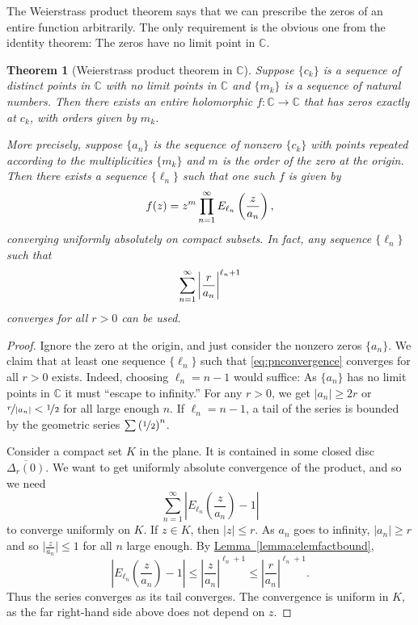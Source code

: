 \documentclass[12pt,openany]{book}
\newcommand{\avoidbreak}{\postdisplaypenalty=100}
\newcommand{\sabs}[1]{\lvert {#1} \rvert}
\newcommand{\babs}[1]{\bigl\lvert {#1} \bigr\rvert}
\newcommand{\abs}[1]{\left\lvert {#1} \right\rvert}
\newcommand{\C}{{\mathbb{C}}}
\newcommand{\myquote}[1]{``#1''}
\theoremstyle{plain}
\newtheorem{thm}{Theorem}[section]
\theoremstyle{remark}
\theoremstyle{definition}
\theoremstyle{exercise}
\theoremstyle{example}
\newcommand{\lemmaref}[1]{\hyperref[#1]{Lemma~\ref*{#1}}}
\begin{document}
The Weierstrass product theorem says that
we can prescribe the zeros of an entire function arbitrarily.
The only requirement is the obvious one from the identity theorem:
The zeros have no limit point in $\C$.

\begin{thm}[Weierstrass product theorem in $\C$]
\index{Weierstrass product theorem in $\C$}
Suppose $\{ c_k \}$ is a sequence of distinct points in $\C$
with no limit points in $\C$ and $\{ m_k \}$ is a sequence of
natural numbers.
Then there exists an entire holomorphic $f \colon \C \to \C$ that
has zeros exactly at $c_k$, with orders given by $m_k$.

More precisely, suppose $\{ a_n \}$ is the sequence of nonzero $\{ c_k \}$ with points
repeated according to the multiplicities $\{ m_k \}$ and $m$
is the order of the zero at the origin.
Then there exists a
sequence $\{ \ell_n \}$ such that one such $f$ is given by
\begin{equation*}
f(z) = z^m \prod_{n=1}^\infty E_{\ell_n}\left(\frac{z}{a_n}\right) ,
\avoidbreak
\end{equation*}
converging uniformly absolutely on compact subsets.
In fact, any sequence $\{ \ell_n \}$ such that
\begin{equation} \label{eq:pnconvergence}
\sum_{n=1}^\infty {\abs{\frac{r}{a_n}}}^{\ell_n+1}
\avoidbreak
\end{equation}
converges for all $r > 0$ can be used.
\end{thm}

\begin{proof}
Ignore the zero at the origin, and just consider the nonzero
zeros $\{ a_n \}$.  We claim that at least one sequence $\{ \ell_n \}$
such that \eqref{eq:pnconvergence} converges for all $r > 0$ exists.
Indeed, choosing $\ell_n = n-1$ would suffice:
As $\{ a_n \}$ has no limit points in $\C$ it must
\myquote{escape to infinity.}
For any $r > 0$, we get $\sabs{a_n} \geq 2r$ or
$\nicefrac{r}{\abs{a_n}} < \nicefrac{1}{2}$
for all large enough $n$.
If $\ell_n = n-1$, a tail of the series is bounded
by the geometric series $\sum {(\nicefrac{1}{2})}^n$.

Consider a compact set $K$ in the plane.  It is contained in some closed disc
$\overline{\Delta_r(0)}$.  We want to get uniformly absolute convergence
of the product, and so we need
\begin{equation*}
\sum_{n=1}^\infty \abs{ E_{\ell_n}\left(\frac{z}{a_n}\right)-1}
\end{equation*}
to converge uniformly on $K$.
If $z \in K$, then $\sabs{z}\leq r$.  As $a_n$ goes to
infinity,
$\sabs{a_n} \geq r$
and so $\babs{\frac{z}{a_n}} \leq 1$
for all $n$ large enough.
By \lemmaref{lemma:elemfactbound},
\begin{equation*}
\abs{ E_{\ell_n}\left(\frac{z}{a_n}\right)-1}
\leq
\abs{\frac{z}{a_n}}^{\ell_n+1}
\leq
\abs{\frac{r}{a_n}}^{\ell_n+1} .
\end{equation*}
Thus the series converges as its tail converges.  The convergence
is uniform in $K$, as the far right-hand side above does not depend on $z$.
\end{proof}
\end{document}
